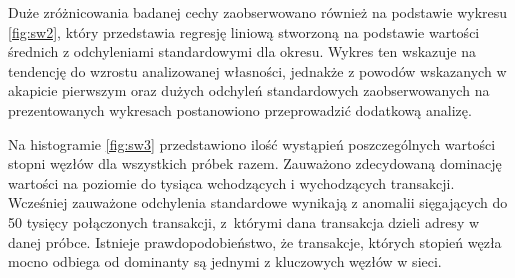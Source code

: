 \documentclass[12pt, twoside, final, openany]{mgr}
\begin{document}
\indent Duże zróżnicowania badanej cechy zaobserwowano również na podstawie wykresu \ref{fig:sw2}, który przedstawia regresję liniową stworzoną na podstawie wartości średnich z odchyleniami standardowymi dla okresu. Wykres ten wskazuje na tendencję do wzrostu analizowanej własności, jednakże z powodów wskazanych w akapicie pierwszym oraz dużych odchyleń standardowych zaobserwowanych na prezentowanych wykresach postanowiono przeprowadzić dodatkową analizę.

\indent Na histogramie \ref{fig:sw3} przedstawiono ilość wystąpień poszczególnych wartości stopni węzłów dla wszystkich próbek razem. Zauważono zdecydowaną dominację wartości na poziomie do tysiąca wchodzących i wychodzących transakcji. Wcześniej zauważone odchylenia standardowe wynikają z anomalii sięgających do 50 tysięcy połączonych transakcji, z~którymi dana transakcja dzieli adresy w danej próbce. Istnieje prawdopodobieństwo, że transakcje, których stopień węzła mocno odbiega od dominanty są jednymi z kluczowych węzłów w sieci.
\end{document}
